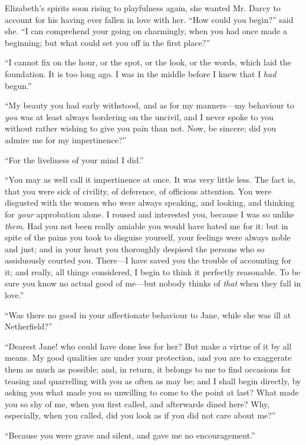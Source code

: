 Elizabeth's spirits soon rising to playfulness again, she wanted Mr. Darcy to account for his having ever fallen in love with her. ``How could you begin?'' said she. ``I can comprehend your going on charmingly, when you had once made a beginning; but what could set you off in the first place?''

``I cannot fix on the hour, or the spot, or the look, or the words, which laid the foundation. It is too long ago. I was in the middle before I knew that I \textit{had} begun.''

``My beauty you had early withstood, and as for my manners---my behaviour to \textit{you} was at least always bordering on the uncivil, and I never spoke to you without rather wishing to give you pain than not. Now, be sincere; did you admire me for my impertinence?''

``For the liveliness of your mind I did.''

``You may as well call it impertinence at once. It was very little less. The fact is, that you were sick of civility, of deference, of officious attention. You were disgusted with the women who were always speaking, and looking, and thinking for \textit{your} approbation alone. I roused and interested you, because I was so unlike \textit{them}. Had you not been really amiable you would have hated me for it: but in spite of the pains you took to disguise yourself, your feelings were always noble and just; and in your heart you thoroughly despised the persons who so assiduously courted you. There---I have saved you the trouble of accounting for it; and really, all things considered, I begin to think it perfectly reasonable. To be sure you know no actual good of me---but nobody thinks of \textit{that} when they fall in love.''

``Was there no good in your affectionate behaviour to Jane, while she was ill at Netherfield?''

``Dearest Jane! who could have done less for her? But make a virtue of it by all means. My good qualities are under your protection, and you are to exaggerate them as much as possible; and, in return, it belongs to me to find occasions for teasing and quarrelling with you as often as may be; and I shall begin directly, by asking you what made you so unwilling to come to the point at last? What made you so shy of me, when you first called, and afterwards dined here? Why, especially, when you called, did you look as if you did not care about me?''

``Because you were grave and silent, and gave me no encouragement.''

